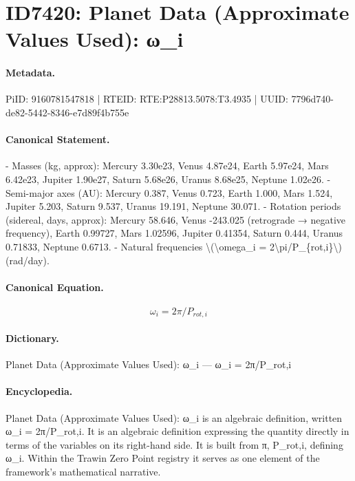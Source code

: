 \section*{ID7420: Planet Data (Approximate Values Used): ω\_i}
\paragraph{Metadata.}
PiID: 9160781547818 | RTEID: RTE:P28813.5078:T3.4935 | UUID: 7796d740-de82-5442-8346-e7d89f4b755e

\paragraph{Canonical Statement.}
- Masses (kg, approx): Mercury 3.30e23, Venus 4.87e24, Earth 5.97e24, Mars 6.42e23, Jupiter 1.90e27, Saturn 5.68e26, Uranus 8.68e25, Neptune 1.02e26. - Semi-major axes (AU): Mercury 0.387, Venus 0.723, Earth 1.000, Mars 1.524, Jupiter 5.203, Saturn 9.537, Uranus 19.191, Neptune 30.071. - Rotation periods (sidereal, days, approx): Mercury 58.646, Venus -243.025 (retrograde → negative frequency), Earth 0.99727, Mars 1.02596, Jupiter 0.41354, Saturn 0.444, Uranus 0.71833, Neptune 0.6713. - Natural frequencies \textbackslash{}(\textbackslash{}omega\_i = 2\textbackslash{}pi/P\_\{rot,i\}\textbackslash{}) (rad/day).

\paragraph{Canonical Equation.}
\[
\omega_i = 2\pi/P_{rot,i}
\]

\paragraph{Dictionary.}
Planet Data (Approximate Values Used): ω\_i — ω\_i = 2π/P\_rot,i

\paragraph{Encyclopedia.}
Planet Data (Approximate Values Used): ω\_i is an algebraic definition, written ω\_i = 2π/P\_rot,i. It is an algebraic definition expressing the quantity directly in terms of the variables on its right-hand side. It is built from π, P\_rot,i, defining ω\_i. Within the Trawin Zero Point registry it serves as one element of the framework's mathematical narrative.
